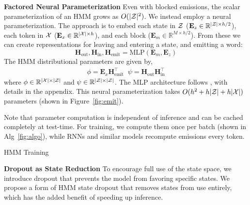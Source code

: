 \documentclass[11pt,a4paper]{article}
\begin{document}
\vspace{0.2cm}

\noindent
\textbf{Factored Neural Parameterization}
Even with blocked emissions, the scalar parameterization of an HMM grows as $O(|\mathcal{Z}|^2)$.
We instead employ a neural parameterization.
The approach is to embed each state in $\mathcal{Z}$ ($\mathbf{E}_z \in \mathbb{R}^{|\mathcal{Z}| \times h/2}$),
each token in $\cal X$ ($\mathbf{E}_x \in \mathbb{R}^{|\mathcal{X}| \times h}$),
and each block ($\mathbf{E}_m \in \mathbb{R}^{M \times h/2}$).
From these we can create representations for leaving and entering a state,
and emitting a word: 
\[ \mathbf{H}_{\textrm{out}},\mathbf{H}_{\textrm{in}},\mathbf{H}_\textrm{emit}
 = \text{MLP}(\mathbf{E}_m, \mathbf{E}_z ) \] 
The HMM distributional parameters are given by,
\begin{equation}
\begin{aligned}
\phi = \mathbf{E}_x \mathbf{H}_\textrm{emit}^\top \;\; 
\psi = \mathbf{H}_\textrm{out} \mathbf{H}_\textrm{in}^\top
\end{aligned}
\end{equation}
where $\phi \in \mathbb{R}^{|\mathcal{X}|\times|\mathcal{Z}|}$ and
$\psi \in \mathbb{R}^{|\mathcal{Z}|\times|\mathcal{Z}|}$.
The MLP architecture follows \cite{kim2019cpcfg}, with details in the appendix.
This neural parameterization takes $O(h^2 + h|\mathcal{Z}| + h|\mathcal{X}|)$ parameters
(shown in Figure~\ref{fig:emit}).

Note that parameter computation is independent of inference
and can be cached completely at test-time.
For training, we compute them once per batch (shown in Alg~\ref{fig:algo}),
while RNNs and similar models recompute emissions every token.


\begin{algorithm}[t]
\begin{algorithmic}
    \EndFor
\end{algorithmic}
\caption{
\label{fig:algo}
HMM Training
}
\end{algorithm}

\vspace{0.2cm}

\noindent
\textbf{Dropout as State Reduction}
To encourage full use of the state space,
we introduce dropout that prevents the model from favoring specific states. 
We propose a form of HMM state dropout that removes states from use entirely,
which has the added benefit of speeding up inference.
\end{document}
